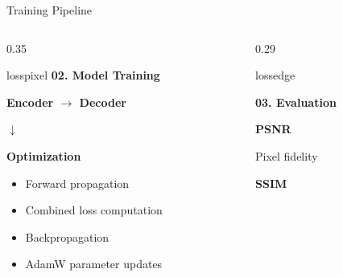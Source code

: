 ﻿\documentclass[
    11pt,%
    aspectratio=169,%
]{beamer}
\begin{document}
\begin{frame}{Training Pipeline}
\begin{columns}[T,onlytextwidth]
\begin{column}{0.35\textwidth}
\begin{beamercolorbox}[
    wd=\linewidth,
    sep=0.09cm,
    rounded=true,
    center
]{losspixel}
    {\color{LossNavy}\bfseries 02. Model Training}

\end{beamercolorbox}

\vspace{0.13cm}

\begin{center}

{\color{LossNavy}\bfseries
Encoder $\longrightarrow$ Decoder}

\vspace{0.10cm}

{\color{DecoderOrange}\Large
$\downarrow$}

\vspace{0.04cm}

{\color{LossNavy}\bfseries Optimization}

\end{center}

\vspace{0.02cm}

\begin{itemize}
    \setlength{\itemsep}{2pt}
    \setlength{\topsep}{2pt}
    \item Forward propagation
    \item Combined loss computation
    \item Backpropagation
    \item AdamW parameter updates
\end{itemize}

\end{column}


\begin{column}{0.29\textwidth}

\begin{beamercolorbox}[
    wd=\linewidth,
    sep=0.09cm,
    rounded=true,
    center
]{lossedge}

    {\color{LossNavy}\bfseries 03. Evaluation}

\end{beamercolorbox}

\vspace{0.10cm}

{\color{LossNavy}\bfseries\large PSNR}

Pixel fidelity

\vspace{0.10cm}

{\color{LossNavy}\bfseries\large SSIM}


\end{column}
\end{columns}
\end{frame}
\end{document}
